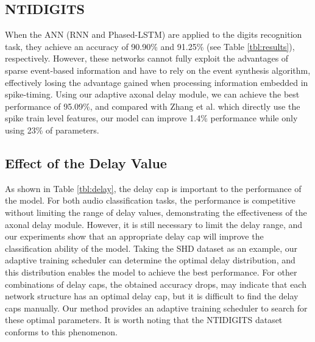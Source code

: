 \documentclass{article}
\begin{document}
\subsection{NTIDIGITS}
When the ANN (RNN and Phased-LSTM) are applied to the digits recognition task, they achieve an accuracy of 90.90\% and 91.25\% (see Table \ref{tbl:results}), respectively. However, these networks cannot fully exploit the advantages of sparse event-based information and have to rely on the event synthesis algorithm, effectively losing the advantage gained when processing information embedded in spike-timing. Using our adaptive axonal delay module, we can achieve the best performance of 95.09\%, and compared with Zhang et al.\cite{zhang2019spike} which  directly use the spike train level features, our model can improve  1.4\% performance while only using 23\% of parameters. 

\subsection{Effect of the Delay Value}
As shown in Table \ref{tbl:delay}, the delay cap is important to the performance of the model. For both audio classification tasks, the performance is competitive without limiting the range of delay values, demonstrating the effectiveness of the axonal delay module. However, it is still necessary to limit the delay range, and our experiments show that an appropriate delay cap will improve the classification ability of the model. Taking the SHD dataset as an example, our adaptive training scheduler can determine the optimal delay distribution, and this distribution enables the model to achieve the best performance. For other combinations of delay caps, the obtained accuracy drops, may indicate that each network structure has an optimal delay cap, but it is difficult to find the delay caps manually. Our method provides an adaptive training scheduler to search for these optimal parameters. It is worth noting that the NTIDIGITS dataset conforms to this phenomenon.
\end{document}
